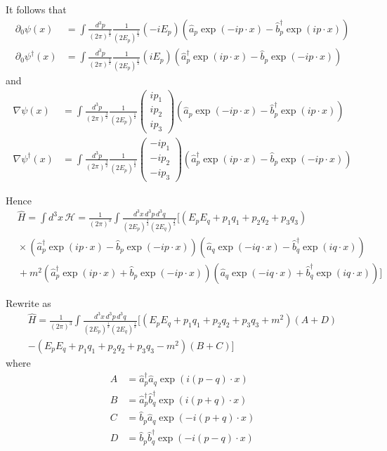 \documentclass[12pt]{article}
\begin{document}
It follows that
\begin{align*}
\partial_0\psi(x)&=\int\frac{d^3p}{(2\pi)^\frac{3}{2}}\frac{1}{(2E_p)^\frac{1}{2}}(-iE_p)
\left(\hat a_p\exp(-ip\cdot x)-\hat b_p^\dag\exp(ip\cdot x)\right)
\\
\partial_0\psi^\dag(x)&=\int\frac{d^3p}{(2\pi)^\frac{3}{2}}\frac{1}{(2E_p)^\frac{1}{2}}(iE_p)
\left(\hat a_p^\dag\exp(ip\cdot x)-\hat b_p\exp(-ip\cdot x)\right)
\end{align*}
and
\begin{align*}
\nabla\psi(x)&=\int\frac{d^3p}{(2\pi)^\frac{3}{2}}\frac{1}{(2E_p)^\frac{1}{2}}
\begin{pmatrix}
ip_1\\ip_2\\ip_3
\end{pmatrix}
\left(\hat a_p\exp(-ip\cdot x)-\hat b_p^\dag\exp(ip\cdot x)\right)
\\
\nabla\psi^\dag(x)&=\int\frac{d^3p}{(2\pi)^\frac{3}{2}}\frac{1}{(2E_p)^\frac{1}{2}}
\begin{pmatrix}
-ip_1\\-ip_2\\-ip_3
\end{pmatrix}
\left(\hat a_p^\dag\exp(ip\cdot x)-\hat b_p\exp(-ip\cdot x)\right)
\end{align*}

Hence
\begin{align*}
&\hat H=\int d^3x\,\mathcal H=\frac{1}{(2\pi)^3}\int\frac{d^3x\,d^3p\,d^3q}{(2E_p)^\frac{1}{2}(2E_q)^\frac{1}{2}}
\bigg[
(E_pE_q+p_1q_1+p_2q_2+p_3q_3)
\\
&{}\times
\left(\hat a_p^\dag\exp(ip\cdot x)-\hat b_p\exp(-ip\cdot x)\right)
\left(\hat a_q\exp(-iq\cdot x)-\hat b_q^\dag\exp(iq\cdot x)\right)
\\
&{}+m^2
\left(\hat a_p^\dag\exp(ip\cdot x)+\hat b_p\exp(-ip\cdot x)\right)
\left(\hat a_q\exp(-iq\cdot x)+\hat b_q^\dag\exp(iq\cdot x)\right)
\bigg]
\end{align*}

Rewrite as
\begin{multline*}
\hat H=\frac{1}{(2\pi)^3}\int\frac{d^3x\,d^3p\,d^3q}{(2E_p)^\frac{1}{2}(2E_q)^\frac{1}{2}}
\bigg[(E_pE_q+p_1q_1+p_2q_2+p_3q_3+m^2)(A+D)
\\
-(E_pE_q+p_1q_1+p_2q_2+p_3q_3-m^2)(B+C)\bigg]
\end{multline*}
where
\begin{align*}
A&=\hat a_p^\dag\hat a_q\exp(i(p-q)\cdot x)
\\
B&=\hat a_p^\dag\hat b_q^\dag\exp(i(p+q)\cdot x)
\\
C&=\hat b_p\hat a_q\exp(-i(p+q)\cdot x)
\\
D&=\hat b_p\hat b_q^\dag\exp(-i(p-q)\cdot x)
\end{align*}
\end{document}
